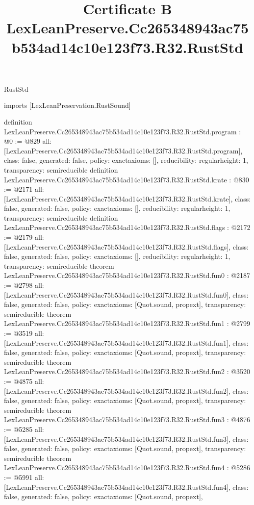 \begin{lexlean}{RustStd}
\title{Certificate B LexLeanPreserve.Cc265348943ac75b534ad14c10e123f73.R32.RustStd}
\begin{coremodule}
imports [LexLeanPreservation.RustSound]

definition LexLeanPreserve.Cc265348943ac75b534ad14c10e123f73.R32.RustStd.program : @0 := @829 {
  all: [LexLeanPreserve.Cc265348943ac75b534ad14c10e123f73.R32.RustStd.program],
  class: false,
  generated: false,
  policy: exact{axioms: []},
  reducibility: regular{height: 1},
  transparency: semireducible
}
definition LexLeanPreserve.Cc265348943ac75b534ad14c10e123f73.R32.RustStd.krate : @830 := @2171 {
  all: [LexLeanPreserve.Cc265348943ac75b534ad14c10e123f73.R32.RustStd.krate],
  class: false,
  generated: false,
  policy: exact{axioms: []},
  reducibility: regular{height: 1},
  transparency: semireducible
}
definition LexLeanPreserve.Cc265348943ac75b534ad14c10e123f73.R32.RustStd.flags : @2172 := @2179 {
  all: [LexLeanPreserve.Cc265348943ac75b534ad14c10e123f73.R32.RustStd.flags],
  class: false,
  generated: false,
  policy: exact{axioms: []},
  reducibility: regular{height: 1},
  transparency: semireducible
}
theorem LexLeanPreserve.Cc265348943ac75b534ad14c10e123f73.R32.RustStd.fun0 : @2187 := @2798 {
  all: [LexLeanPreserve.Cc265348943ac75b534ad14c10e123f73.R32.RustStd.fun0],
  class: false,
  generated: false,
  policy: exact{axioms: [Quot.sound, propext]},
  transparency: semireducible
}
theorem LexLeanPreserve.Cc265348943ac75b534ad14c10e123f73.R32.RustStd.fun1 : @2799 := @3519 {
  all: [LexLeanPreserve.Cc265348943ac75b534ad14c10e123f73.R32.RustStd.fun1],
  class: false,
  generated: false,
  policy: exact{axioms: [Quot.sound, propext]},
  transparency: semireducible
}
theorem LexLeanPreserve.Cc265348943ac75b534ad14c10e123f73.R32.RustStd.fun2 : @3520 := @4875 {
  all: [LexLeanPreserve.Cc265348943ac75b534ad14c10e123f73.R32.RustStd.fun2],
  class: false,
  generated: false,
  policy: exact{axioms: [Quot.sound, propext]},
  transparency: semireducible
}
theorem LexLeanPreserve.Cc265348943ac75b534ad14c10e123f73.R32.RustStd.fun3 : @4876 := @5285 {
  all: [LexLeanPreserve.Cc265348943ac75b534ad14c10e123f73.R32.RustStd.fun3],
  class: false,
  generated: false,
  policy: exact{axioms: [Quot.sound, propext]},
  transparency: semireducible
}
theorem LexLeanPreserve.Cc265348943ac75b534ad14c10e123f73.R32.RustStd.fun4 : @5286 := @5991 {
  all: [LexLeanPreserve.Cc265348943ac75b534ad14c10e123f73.R32.RustStd.fun4],
  class: false,
  generated: false,
  policy: exact{axioms: [Quot.sound, propext]},
}
\end{coremodule}
\end{lexlean}
